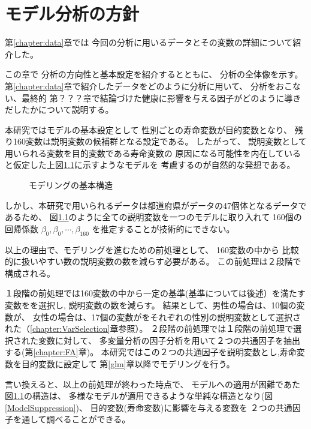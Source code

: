 



\chapter{モデル分析の方針}\label{chapter:methods}


第\ref{chapter:data}章では
今回の分析に用いるデータとその変数の詳細について紹介した。

この章で
分析の方向性と基本設定を紹介するとともに、
分析の全体像を示す。
第\ref{chapter:data}章で紹介したデータをどのように分析に用いて、
分析をおこない、最終的
第？？？章で結論づけた健康に影響を与える因子がどのように導きだしたかについて説明する。

本研究ではモデルの基本設定として
性別ごとの寿命変数が目的変数となり、
残り160変数は説明変数の候補群となる設定である。
したがって、
説明変数として用いられる変数を目的変数である寿命変数の
原因になる可能性を内在していると仮定した上図\ref{ModelStructure}に示すようなモデルを
考慮するのが自然的な発想である。


\begin{figure}[H]
	\caption{モデリングの基本構造}
	\label{ModelStructure}
\end{figure}



しかし、本研究で用いられるデータは都道府県がデータの47個体となるデータであるため、
図\ref{ModelStructure}のように全ての説明変数を一つのモデルに取り入れて
160個の回帰係数
$\beta_0 ,\beta_0 ,\cdots , \beta_{160}$
を推定することが技術的にできない。

以上の理由で、モデリングを進むための前処理として、
160変数の中から
比較的に扱いやすい数の説明変数の数を減らす必要がある。
この前処理は２段階で構成される。

１段階の前処理では160変数の中から一定の基準(基準については後述）を満たす変数をを選択し, 説明変数の数を減らす。
結果として、男性の場合は、10個の変数が、
女性の場合は、17個の変数がをそれぞれの性別の説明変数として選択された（\ref{chapter:VarSelection}章参照）。
２段階の前処理では１段階の前処理で選択された変数に対して、
多変量分析の因子分析を用いて２つの共通因子を抽出する(第\ref{chapter:FA}章)。
本研究ではこの２つの共通因子を説明変数とし,寿命変数を目的変数に設定して
第\ref{glm}章以降でモデリングを行う。

言い換えると、以上の前処理が終わった時点で、
モデルへの適用が困難であた
図\ref{ModelStructure}の構造は、
多様なモデルが適用できるような単純な構造となり(図\ref{ModelSuppression})、
目的変数(寿命変数)に影響を与える変数を
２つの共通因子を通して調べることができる。

